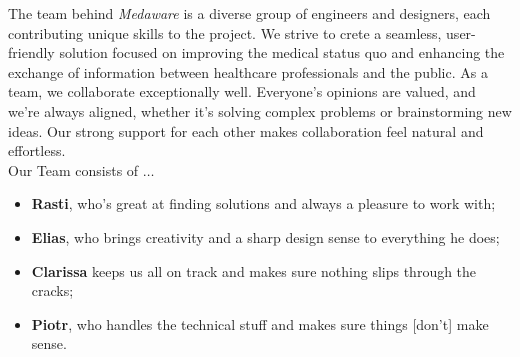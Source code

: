 The team behind \textit{Medaware} is a diverse group of engineers and designers, each contributing unique skills to the project.
We strive to crete a seamless, user-friendly solution focused on improving the medical status quo and enhancing the exchange of
information between healthcare professionals and the public. As a team, we collaborate exceptionally well. Everyone's
opinions are valued, and we're always aligned, whether it's solving complex problems or brainstorming new ideas.
Our strong support for each other makes collaboration feel natural and effortless.\\[2\baselineskip]
Our Team consists of $\dots$ \\
\begin{itemize}
	\renewcommand{\labelitemi}{}
	\item \textbf{Rasti}, who's great at finding solutions and always a pleasure to work with;
	\item \textbf{Elias}, who brings creativity and a sharp design sense to everything he does;
	\item \textbf{Clarissa} keeps us all on track and makes sure nothing slips through the cracks;
	\item \textbf{Piotr}, who handles the technical stuff and makes sure things [don't] make sense.
\end{itemize}
